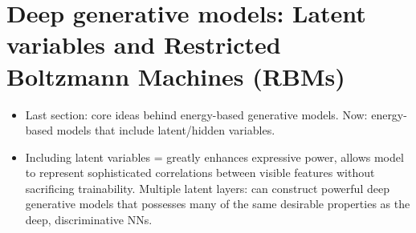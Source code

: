 \documentclass[norsk,a4paper,11pt]{article}
\begin{document}
\section{Deep generative models: Latent variables and Restricted Boltzmann Machines (RBMs)}
\begin{itemize}
	\item Last section: core ideas behind energy-based generative models. Now: energy-based models that include latent/hidden variables.
	\item Including latent variables = greatly enhances expressive power, allows model to represent sophisticated correlations between visible features without sacrificing trainability. Multiple latent layers: can construct powerful deep generative models that possesses many of the same desirable properties as the deep, discriminative NNs.
\end{itemize}
\end{document}
